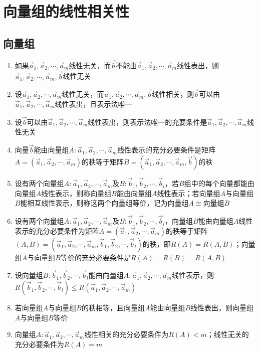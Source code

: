 \documentclass[12pt,a4paper,UTF8]{book}
\begin{document}
\section{向量组的线性相关性}
\subsection{向量组}
\begin{enumerate}
\item 如果$\vec{a}_1,\vec{a}_2,\cdots,\vec{a}_m$线性无关，而$\vec{b}$不能由$\vec{a}_1,\vec{a}_2,\cdots,\vec{a}_m$线性表出，则$\vec{a}_1,\vec{a}_2,\cdots,\vec{a}_m,\vec{b}$线性无关
\item 设$\vec{a}_1,\vec{a}_2,\cdots,\vec{a}_m$线性无关，而$\vec{a}_1,\vec{a}_2,\cdots,\vec{a}_m,\vec{b}$线性相关，则$\vec{b}$可以由$\vec{a}_1,\vec{a}_2,\cdots,\vec{a}_m$线性表出，且表示法唯一
\item 设$\vec{b}$可以由$\vec{a}_1,\vec{a}_2,\cdots,\vec{a}_m$线性表出，则表示法唯一的充要条件是$\vec{a}_1,\vec{a}_2,\cdots,\vec{a}_m$线性无关
\item 向量$\vec{b}$能由向量组$A:\vec{a}_1,\vec{a}_2,\cdots,\vec{a}_m$线性表示的充分必要条件是矩阵$A=\left(\vec{a}_1,\vec{a}_2,\cdots,\vec{a}_m\right)$的秩等于矩阵$B=\left(\vec{a}_1,\vec{a}_2,\cdots,\vec{a}_m,\vec{b}\right)$的秩
\item 设有两个向量组$A:\vec{a}_1,\vec{a}_2,\cdots,\vec{a}_m$及$B:\vec{b}_1,\vec{b}_2,\cdots,\vec{b}_l$，若$B$组中的每个向量都能由向量组$A$线性表示，则称向量组$B$能由向量组$A$线性表示；若向量组$A$与向量组$B$能相互线性表示，则称这两个向量组等价，记为$\text{向量组}A\cong\text{向量组}B$
\item 设有两个向量组$A:\vec{a}_1,\vec{a}_2,\cdots,\vec{a}_m$及$B:\vec{b}_1,\vec{b}_2,\cdots,\vec{b}_l$，向量组$B$能由向量组$A$线性表示的充分必要条件为矩阵$A=\left(\vec{a}_1,\vec{a}_2,\cdots,\vec{a}_m\right)$的秩等于矩阵$\left(A,B\right)=\left(\vec{a}_1,\vec{a}_2,\cdots,\vec{a}_m,\vec{b}_1,\vec{b}_2,\cdots,\vec{b}_l\right)$的秩，即$R\left(A\right)=R\left(A,B\right)$；向量组$A$与向量组$B$等价的充分必要条件是$R\left(A\right)=R\left(B\right)=R\left(A,B\right)$
\item 设向量组$B:\vec{b}_1,\vec{b}_2,\cdots,\vec{b}_l$能由向量组$A:\vec{a}_1,\vec{a}_2,\cdots,\vec{a}_m$线性表示，则$R\left(\vec{b}_1,\vec{b}_2,\cdots,\vec{b}_l\right)\leq R\left(\vec{a}_1,\vec{a}_2,\cdots,\vec{a}_m\right)$
\item 若向量组$A$与向量组$B$的秩相等，且向量组$A$能由向量组$B$线性表出，则向量组$A$与向量组$B$等价
\item 向量组$A:\vec{a}_1,\vec{a}_2,\cdots,\vec{a}_m$线性相关的充分必要条件为$R\left(A\right)<m$；线性无关的充分必要条件为$R\left(A\right)=m$

\end{enumerate}
\end{document}
